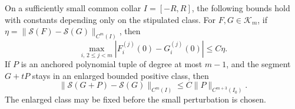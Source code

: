 \begin{lemma}
\label{lem:v68-finite-comparison}
On a sufficiently small common collar $I=[-R,R]$, the following
bounds hold with constants depending only on the stipulated class.
For $F,G\in\mathcal K_m$, if
$\eta=\|\mathcal S(F)-\mathcal S(G)\|_{C^m(I)}$, then
\begin{equation}\label{eq:v68-jet-alignment-bound}
 \max_{i,\,2\le j<m}|F_i^{(j)}(0)-G_i^{(j)}(0)|\le C\eta.
\end{equation}
If $P$ is an anchored polynomial tuple of degree at most $m-1$,
and the segment $G+tP$ stays in an enlarged bounded positive class,
then
\begin{equation}\label{eq:v68-polynomial-action-bound}
 \|\mathcal S(G+P)-\mathcal S(G)\|_{C^m(I)}
                         \le C\|P\|_{C^{m+3}(I_0)}.
\end{equation}
The enlarged class may be fixed before the small perturbation is chosen.
\end{lemma}
